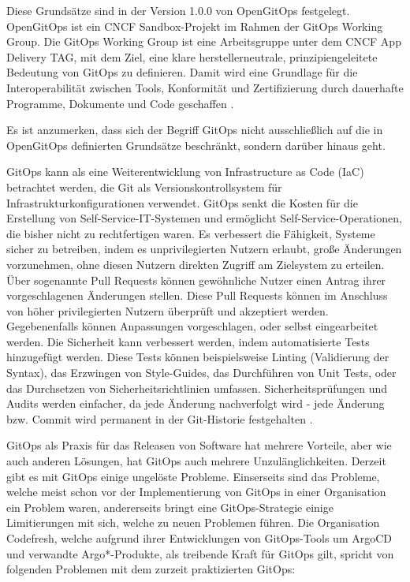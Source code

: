 \noindent
Diese Grundsätze sind in der Version 1.0.0 von OpenGitOps festgelegt.
OpenGitOps ist ein CNCF Sandbox-Projekt im Rahmen der GitOps Working Group.
Die GitOps Working Group ist eine Arbeitsgruppe unter
dem CNCF App Delivery TAG,
mit dem Ziel, eine klare herstellerneutrale,
prinzipiengeleitete Bedeutung von GitOps zu definieren.
Damit wird eine Grundlage für die Interoperabilität zwischen Tools, Konformität und Zertifizierung durch dauerhafte Programme, Dokumente und Code geschaffen
\autocite{opengitopsDocuments}.
\bigskip

\noindent
Es ist anzumerken, dass sich der Begriff GitOps nicht ausschließlich auf
die in OpenGitOps definierten Grundsätze beschränkt,
sondern darüber hinaus geht.
\bigskip

\noindent
GitOps kann als eine Weiterentwicklung von Infrastructure as Code (IaC) betrachtet werden, die Git als Versionskontrollsystem für Infrastrukturkonfigurationen verwendet.
GitOps senkt die Kosten für die Erstellung von Self-Service-IT-Systemen und ermöglicht Self-Service-Operationen, die bisher nicht zu rechtfertigen waren.
Es verbessert die Fähigkeit, Systeme sicher zu betreiben, indem es
unprivilegierten Nutzern erlaubt, große Änderungen vorzunehmen,
ohne diesen Nutzern direkten Zugriff am Zielsystem zu erteilen.
Über sogenannte Pull Requests können gewöhnliche Nutzer einen Antrag
ihrer vorgeschlagenen Änderungen stellen.
Diese Pull Requests können im Anschluss von höher privilegierten Nutzern
überprüft und akzeptiert werden.
Gegebenenfalls können Anpassungen vorgeschlagen, oder selbst eingearbeitet werden.
Die Sicherheit kann verbessert werden, indem automatisierte Tests hinzugefügt werden.
Diese Tests können beispielsweise
Linting (Validierung der Syntax),
das Erzwingen von Style-Guides,
das Durchführen von Unit Tests,
oder
das Durchsetzen von Sicherheitsrichtlinien
umfassen.
Sicherheitsprüfungen und Audits werden einfacher, 
da jede Änderung nachverfolgt wird -
jede Änderung bzw. Commit wird permanent in der Git-Historie festgehalten
\autocite{limoncelli_gitopsPathToMoreSelfService}.
\bigskip


\noindent
GitOps als Praxis für das Releasen von Software hat mehrere Vorteile,
aber wie auch anderen Lösungen, hat GitOps auch mehrere Unzulänglichkeiten.
Derzeit gibt es mit GitOps einige ungelöste Probleme.
Einserseits sind das Probleme, welche meist schon 
vor der Implementierung von GitOps in einer Organisation ein Problem waren,
andererseits bringt eine GitOps-Strategie einige Limitierungen mit sich,
welche zu neuen Problemen führen.
Die Organisation Codefresh,
welche aufgrund ihrer Entwicklungen
von GitOps-Tools um ArgoCD und verwandte Argo*-Produkte,
als treibende Kraft für GitOps gilt,
spricht von folgenden Problemen mit dem zurzeit praktizierten GitOps:

